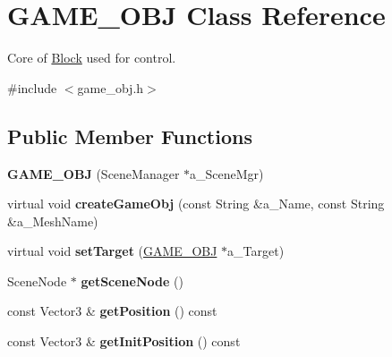 \hypertarget{class_g_a_m_e___o_b_j}{\section{G\-A\-M\-E\-\_\-\-O\-B\-J Class Reference}
\label{class_g_a_m_e___o_b_j}
}


Core of \hyperlink{class_block}{Block} used for control.  




{\ttfamily \#include $<$game\-\_\-obj.\-h$>$}

\subsection*{Public Member Functions}
\begin{DoxyCompactItemize}
\item 
\hypertarget{class_g_a_m_e___o_b_j_a6f0bcfa20d9187abfe3960f4df04cec4}{{\bfseries G\-A\-M\-E\-\_\-\-O\-B\-J} (Scene\-Manager $\ast$a\-\_\-\-Scene\-Mgr)}\label{class_g_a_m_e___o_b_j_a6f0bcfa20d9187abfe3960f4df04cec4}

\item 
\hypertarget{class_g_a_m_e___o_b_j_a013242ff24c23b943759280591ece4d6}{virtual void {\bfseries create\-Game\-Obj} (const String \&a\-\_\-\-Name, const String \&a\-\_\-\-Mesh\-Name)}\label{class_g_a_m_e___o_b_j_a013242ff24c23b943759280591ece4d6}

\item 
\hypertarget{class_g_a_m_e___o_b_j_ad6fcccdeb18391806452db356b479bee}{virtual void {\bfseries set\-Target} (\hyperlink{class_g_a_m_e___o_b_j}{G\-A\-M\-E\-\_\-\-O\-B\-J} $\ast$a\-\_\-\-Target)}\label{class_g_a_m_e___o_b_j_ad6fcccdeb18391806452db356b479bee}

\item 
\hypertarget{class_g_a_m_e___o_b_j_ac87e275bf68c911e4d64785d2a3836e5}{Scene\-Node $\ast$ {\bfseries get\-Scene\-Node} ()}\label{class_g_a_m_e___o_b_j_ac87e275bf68c911e4d64785d2a3836e5}

\item 
\hypertarget{class_g_a_m_e___o_b_j_a5a124501753fee239e83210cb255cdc2}{const Vector3 \& {\bfseries get\-Position} () const }\label{class_g_a_m_e___o_b_j_a5a124501753fee239e83210cb255cdc2}

\item 
\hypertarget{class_g_a_m_e___o_b_j_ab0c335efcbb8f80bb897a92441168f5e}{const Vector3 \& {\bfseries get\-Init\-Position} () const }\label{class_g_a_m_e___o_b_j_ab0c335efcbb8f80bb897a92441168f5e}


\end{DoxyCompactItemize}
